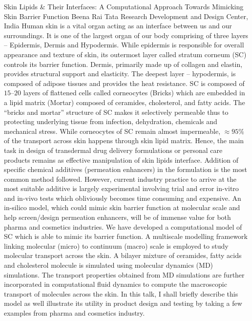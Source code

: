 
    \begin{abstract_online}{Skin Lipids & Their Interfaces: A Computational Approach Towards Mimicking Skin Barrier Function }{%
        Beena Rai}{%
        \IStag}{%
        Tata Research Development and Design Center, India}
    Human skin is a vital organ acting as an interface between us and our surroundings. It is one of the largest organ of our body comprising of three layers – Epidermis, Dermis and Hypodermis. While epidermis is responsible for overall appearance and texture of skin, its outermost layer called stratum corneum (SC) controls its barrier function. Dermis, primarily made up of collagen and elastin, provides structural support and elasticity. The deepest layer – hypodermis, is composed of adipose tissues and provides the heat resistance.  SC is composed of $15–20$ layers of flattened cells called corneocytes (Bricks) which are embedded in a lipid matrix (Mortar) composed of ceramides, cholesterol, and fatty acids. The “bricks and mortar” structure of SC makes it selectively permeable thus to protecting underlying tissue from infection, dehydration, chemicals and mechanical stress. While corneocytes of SC remain almost impermeable, $\approx 95 \%$ of the transport across skin happens through skin lipid matrix. Hence, the main task in design of transdermal drug delivery formulations or personal care products remains as effective manipulation of skin lipids interface. Addition of specific chemical additives (permeation enhancers) in the formulation is the most common method followed. However, current industry practice to arrive at the most suitable additive is largely experimental involving trial and error in-vitro and in-vivo tests which obliviously becomes time consuming and expensive. An in-silico model, which could mimic skin barrier function at molecular scale and help screen/design permeation enhancers, will be of immense value for both pharma and cosmetics industries.    We have developed a computational model of SC which is able to mimic its barrier function. A multiscale modelling framework linking molecular (micro) to continuum (macro) scale is employed to study molecular transport across the skin. A bilayer mixture of ceramides, fatty acids and cholesterol molecule is simulated using molecular dynamics (MD) simulations. The transport properties obtained from MD simulations are further incorporated in computational fluid dynamics to compute the macroscopic transport of molecules across the skin. In this talk, I shall briefly describe this model as well illustrate its utility in product design and testing by taking a few examples from pharma and cosmetics industry. 
    
    \end{abstract_online}
    